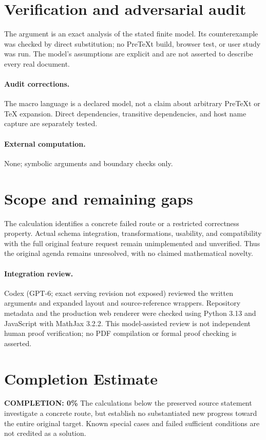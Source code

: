 \documentclass[11pt]{article}
\begin{document}
\section{Verification and adversarial audit}
The argument is an exact analysis of the stated finite model. Its counterexample was checked by direct substitution; no PreTeXt build, browser test, or user study was run. The model's assumptions are explicit and are not asserted to describe every real document.
\paragraph{Audit corrections.} The macro language is a declared model, not a claim about arbitrary PreTeXt or TeX expansion. Direct dependencies, transitive dependencies, and host name capture are separately tested.
\paragraph{External computation.} None; symbolic arguments and boundary checks only.
\section{Scope and remaining gaps}
The calculation identifies a concrete failed route or a restricted correctness property. Actual schema integration, transformations, usability, and compatibility with the full original feature request remain unimplemented and unverified. Thus the original agenda remains unresolved, with no claimed mathematical novelty.
\paragraph{Integration review.} Codex (GPT-6; exact serving revision not exposed) reviewed the written arguments and expanded layout and source-reference wrappers. Repository metadata and the production web renderer were checked using Python 3.13 and JavaScript with MathJax 3.2.2. This model-assisted review is not independent human proof verification; no PDF compilation or formal proof checking is asserted.

\section{Completion Estimate}
\noindent\textbf{COMPLETION: 0\%}
The calculations below the preserved source statement investigate a concrete route,
but establish no substantiated new progress toward the entire original target.
Known special cases and failed sufficient conditions are not credited as a solution.
\end{document}
